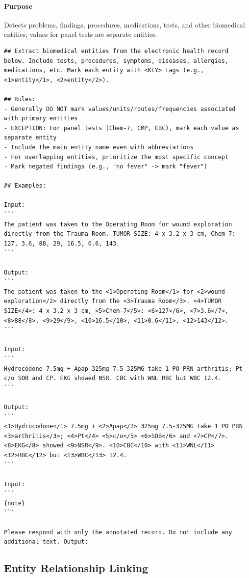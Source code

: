 \paragraph{Purpose} Detects problems, findings, procedures, medications, tests, and other biomedical entities; values for panel tests are separate entities.
\begin{lstlisting}
## Extract biomedical entities from the electronic health record below. Include tests, procedures, symptoms, diseases, allergies, medications, etc. Mark each entity with <KEY> tags (e.g., <1>entity</1>, <2>entity</2>).

## Rules:
- Generally DO NOT mark values/units/routes/frequencies associated with primary entities
- EXCEPTION: For panel tests (Chem-7, CMP, CBC), mark each value as separate entity
- Include the main entity name even with abbreviations
- For overlapping entities, prioritize the most specific concept
- Mark negated findings (e.g., "no fever" -> mark "fever")

## Examples:

Input:
```
The patient was taken to the Operating Room for wound exploration directly from the Trauma Room. TUMOR SIZE: 4 x 3.2 x 3 cm, Chem-7: 127, 3.6, 88, 29, 16.5, 0.6, 143.
```

Output:
```
The patient was taken to the <1>Operating Room</1> for <2>wound exploration</2> directly from the <3>Trauma Room</3>. <4>TUMOR SIZE</4>: 4 x 3.2 x 3 cm, <5>Chem-7</5>: <6>127</6>, <7>3.6</7>, <8>88</8>, <9>29</9>, <10>16.5</10>, <11>0.6</11>, <12>143</12>.
```

Input:
```
Hydrocodone 7.5mg + Apap 325mg 7.5-325MG take 1 PO PRN arthritis; Pt c/o SOB and CP. EKG showed NSR. CBC with WNL RBC but WBC 12.4.
```

Output:
```
<1>Hydrocodone</1> 7.5mg + <2>Apap</2> 325mg 7.5-325MG take 1 PO PRN <3>arthritis</3>; <4>Pt</4> <5>c/o</5> <6>SOB</6> and <7>CP</7>. <8>EKG</8> showed <9>NSR</9>. <10>CBC</10> with <11>WNL</11> <12>RBC</12> but <13>WBC</13> 12.4.
```

Input:
```
{note}
```

Please respond with only the annotated record. Do not include any additional text. Output:
\end{lstlisting}

\subsection{Entity Relationship Linking}
